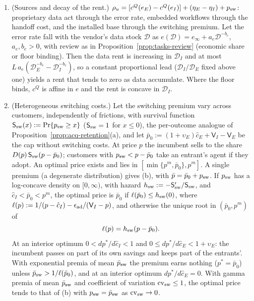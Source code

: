 \begin{proposition}
\begin{enumerate}
\item[(e)] (Sources and decay of the rent.) $\rho_u=[c^Q(e_E)-c^Q(e_I)]+(\eta_E-\eta_I)+p_{\rm sw}$: proprietary data act through the error rate, embedded workflows through the handoff cost, and the installed base through the switching premium. Let the error rate fall with the vendor's data stock $\mathcal D$ as $e(\mathcal D)=e_\infty+a_e\mathcal D^{-b_e}$, $a_e,b_e>0$, with review as in Proposition~\ref{prop:tasks-review} (economic share or floor binding). Then the data rent is increasing in $\mathcal D_I$ and at most $L\,a_e(\mathcal D_E^{-b_e}-\mathcal D_I^{-b_e})$, so a constant proportional lead ($\mathcal D_I/\mathcal D_E$ fixed above one) yields a rent that tends to zero as data accumulate. Where the floor binds, $c^Q$ is affine in $e$ and the rent is concave in $\mathcal D_I$.
\item[(f)] (Heterogeneous switching costs.) Let the switching premium vary across customers, independently of frictions, with survival function $\mathsf S_{\rm sw}(x):=\Pr\{p_{\rm sw}\ge x\}$ ($\mathsf S_{\rm sw}=1$ for $x\le 0$), the per-outcome analogue of Proposition~\ref{prop:acq-retention}(a), and let $\bar p_0:=(1+\upsilon_E)\hat c_E+\mathsf V_I-\mathsf V_E$ be the cap without switching costs. At price $p$ the incumbent sells to the share $D(p)\,\mathsf S_{\rm sw}(p-\bar p_0)$; customers with $p_{\rm sw}<p-\bar p_0$ take an entrant's agent if they adopt. An optimal price exists and lies in $[\min\{p^m,\bar p_0\},p^m]$. A single premium (a degenerate distribution) gives (b), with $\bar p=\bar p_0+p_{\rm sw}$. If $p_{\rm sw}$ has a log-concave density on $[0,\infty)$, with hazard $h_{\rm sw}:=-\mathsf S'_{\rm sw}/\mathsf S_{\rm sw}$, and $\hat c_I<\bar p_0<p^m$, the optimal price is $\bar p_0$ if $\ell(\bar p_0)\le h_{\rm sw}(0)$, where $\ell(p):=1/(p-\hat c_I)-\epsilon_{\rm ad}/(\mathsf V_I-p)$, and otherwise the unique root in $(\bar p_0,p^m)$ of
\begin{equation}\label{eq:prod-het}
\ell(p)=h_{\rm sw}(p-\bar p_0).
\end{equation}
At an interior optimum $0<dp^*/d\hat c_I<1$ and $0\le dp^*/d\hat c_E<1+\upsilon_E$: the incumbent passes on part of its own savings and keeps part of the entrants'. With exponential premia of mean $\bar p_{\rm sw}$ the premium earns nothing ($p^*=\bar p_0$) unless $\bar p_{\rm sw}>1/\ell(\bar p_0)$, and at an interior optimum $dp^*/d\hat c_E=0$. With gamma premia of mean $\bar p_{\rm sw}$ and coefficient of variation $\mathrm{cv}_{\rm sw}\le 1$, the optimal price tends to that of (b) with $p_{\rm sw}=\bar p_{\rm sw}$ as $\mathrm{cv}_{\rm sw}\to 0$.
\end{enumerate}
\end{proposition}

